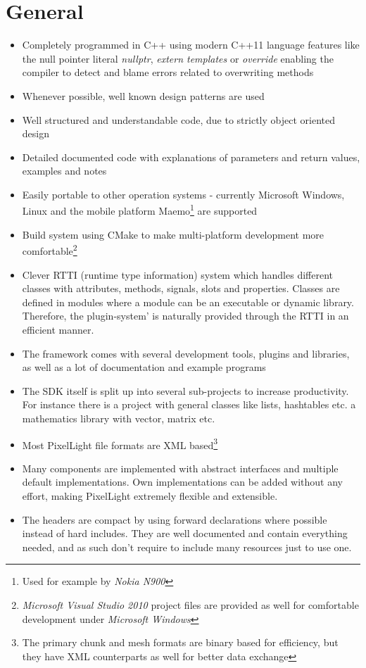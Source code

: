 \section{General}
\begin{itemize}
\item{Completely programmed in C++ using modern C++11 language features like the null pointer literal \emph{nullptr}, \emph{extern templates} or \emph{override} enabling the compiler to detect and blame errors related to overwriting methods}
\item{Whenever possible, well known design patterns are used}
\item{Well structured and understandable code, due to strictly object oriented design}
\item{Detailed documented code with explanations of parameters and return values, examples and notes}
\item{Easily portable to other operation systems - currently Microsoft Windows, Linux and the mobile platform Maemo\footnote{Used for example by \emph{Nokia N900}} are supported}
\item{Build system using CMake to make multi-platform development more comfortable\footnote{\emph{Microsoft Visual Studio 2010} project files are provided as well for comfortable development under \emph{Microsoft Windows}}}
\item{Clever RTTI (runtime type information) system which handles different classes with attributes, methods, signals, slots and properties. Classes are defined in modules where a module can be an executable or dynamic library. Therefore, the plugin-system' is naturally provided through the RTTI in an efficient manner.}
\item{The framework comes with several development tools, plugins and libraries, as well as a lot of documentation and example programs}
\item{The SDK itself is split up into several sub-projects to increase productivity. For instance there is a project with general classes like lists, hashtables etc. a mathematics library with vector, matrix etc.}
\item{Most PixelLight file formats are XML based\footnote{The primary chunk and mesh formats are binary based for efficiency, but they have XML counterparts as well for better data exchange}}
\item{Many components are implemented with abstract interfaces and multiple default implementations. Own implementations can be added without any effort, making PixelLight extremely flexible and extensible.}
\item{The headers are compact by using forward declarations where possible instead of hard includes. They are well documented and contain everything needed, and as such don't require to include many resources just to use one.}
\end{itemize}





